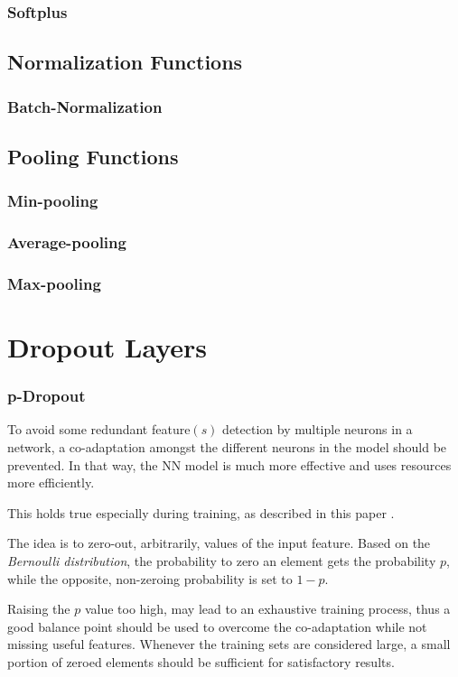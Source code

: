 \subsubsection{Softplus}

\subsection{Normalization Functions}
\subsubsection{Batch-Normalization}

\subsection{Pooling Functions}
\subsubsection{Min-pooling}
\subsubsection{Average-pooling}
\subsubsection{Max-pooling}

\section{Dropout Layers}
\subsubsection{p-Dropout}
To avoid some redundant feature\((s)\) detection by multiple neurons in a network,
a co-adaptation amongst the different neurons in the model should be prevented. 
In that way, the NN model is much more effective and uses resources more efficiently.

This holds true especially during training, as described in this paper
\citep{hinton2012improving}.

The idea is to zero-out, arbitrarily, values of
the input feature. 
Based on the \emph{Bernoulli distribution}, the probability to zero an element gets the
probability \(p\), while the opposite, non-zeroing probability is set to \(1-p\). 

Raising the \(p\) value too high, may lead to an exhaustive training process, thus 
a good balance point should be used to overcome the co-adaptation while not missing 
useful features. Whenever the training sets are considered large, a small portion 
of zeroed elements should be sufficient for satisfactory results.  

